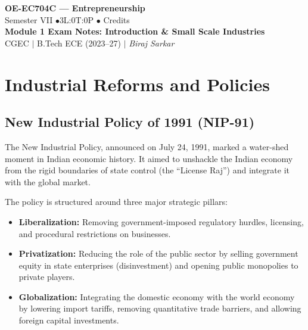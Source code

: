 \documentclass[12pt,a4paper]{article}
\begin{document}

\begin{center}
  {\LARGE\bfseries\color{myred} OE-EC704C --- Entrepreneurship}\\[5pt]
  {\normalsize\color{mydark} Semester VII \quad$\bullet$\quad 3L:0T:0P \quad$\bullet$ Credits}\\[3pt]
  {\normalsize\color{myteal}\textbf{Module 1 Exam Notes: Introduction \& Small Scale Industries}}\\[3pt]
  {\small\color{mydark} CGEC \;$|$\; B.Tech ECE (2023--27) \;$|$\; \textit{Biraj Sarkar}}
\end{center}
\vspace{2pt}
\noindent{\color{myred}\rule{\linewidth}{1.5pt}}
\vspace{2pt}

\hypersetup{linkcolor=mydark}
\tableofcontents
\hypersetup{linkcolor=myteal}
\newpage

\section{Industrial Reforms and Policies}

\subsection{New Industrial Policy of 1991 (NIP-91)}
The New Industrial Policy, announced on July 24, 1991, marked a water-shed moment in Indian economic history. It aimed to unshackle the Indian economy from the rigid boundaries of state control (the ``License Raj'') and integrate it with the global market. 

\begin{tcolorbox}[defbox, title={Core Pillars of NIP-91: LPG}]
The policy is structured around three major strategic pillars:
\begin{itemize}[leftmargin=*, itemsep=2pt, topsep=0pt]
  \item \textbf{Liberalization:} Removing government-imposed regulatory hurdles, licensing, and procedural restrictions on businesses.
  \item \textbf{Privatization:} Reducing the role of the public sector by selling government equity in state enterprises (disinvestment) and opening public monopolies to private players.
  \item \textbf{Globalization:} Integrating the domestic economy with the world economy by lowering import tariffs, removing quantitative trade barriers, and allowing foreign capital investments.
\end{itemize}
\end{tcolorbox}
\end{document}
